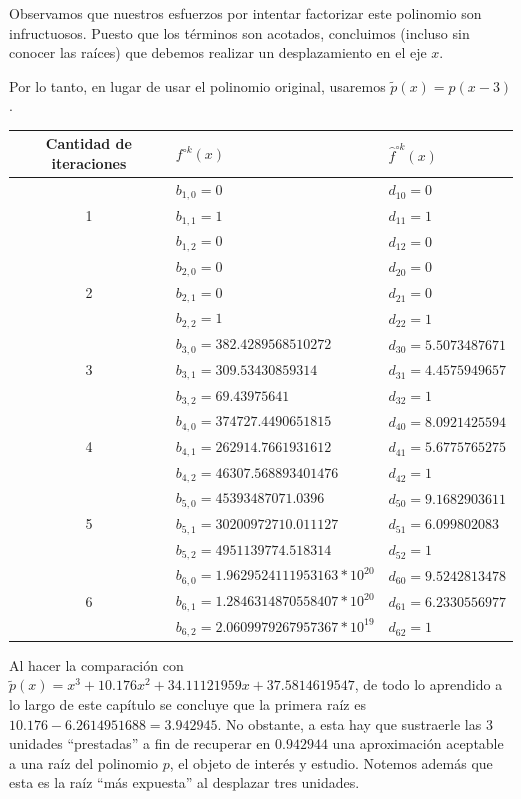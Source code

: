 \documentclass[oneside,11pt]{book}
\theoremstyle{definition}
\theoremstyle{plain}
\theoremstyle{remark}
\begin{document}
Observamos que nuestros esfuerzos por intentar factorizar este polinomio son infructuosos.
Puesto que los t\'erminos son acotados, concluimos (incluso sin conocer las ra\'ices) 
que debemos realizar un desplazamiento en el eje $x$.

Por lo tanto, en lugar de usar el polinomio original, usaremos $\tilde{p}(x)=p(x-3)$. 

\begin{center}
\begin{tabular}{ | c | l | l| }
\hline
 Cantidad de iteraciones & $f^{\circ k}(x)$& $\hat{f}^{\circ k}(x)$ \\
 \hline 
& $b_{1,0}= 0$ & $d_{10}=0$\\
1 & $b_{1,1}= 1$  & $d_{11}=1$\\ 
& $b_{1,2}= 0$ & $d_{12}=0$\\  
 \hline 
& $b_{2,0}= 0$& $d_{20}=0$ \\
2 & $b_{2,1}= 0$ & $d_{21}=0$\\ 
& $b_{2,2}= 1$& $d_{22}=1$\\
\hline
& $b_{3,0}= 382.4289568510272$ & $d_{30}=5.5073487671$\\
3 & $b_{3,1}= 309.53430859314$ & $d_{31}=4.4575949657$\\ 
& $b_{3,2}= 69.43975641$ & $d_{32}=1$\\
\hline
& $b_{4,0}= 374727.4490651815$ & $d_{40}=8.0921425594$\\
4 & $b_{4,1}= 262914.7661931612$   & $d_{41}=5.6775765275$\\ 
& $b_{4,2}= 46307.568893401476$ & $d_{42}=1$\\
\hline
& $b_{5,0}= 45393487071.0396$ & $d_{50}=9.1682903611$\\
5 & $b_{5,1}= 30200972710.011127$  & $d_{51}=6.099802083$\\ 
& $b_{5,2}= 4951139774.518314$ & $d_{52}=1$\\
\hline
& $b_{6,0}= 1.9629524111953163*10^{20}$ & $d_{60}=9.5242813478$\\
6 & $b_{6,1}= 1.2846314870558407*10^{20}$ & $d_{61}=6.2330556977$\\ 
& $b_{6,2}= 2.0609979267957367*10^{19}$ & $d_{62}=1$\\
\hline
\end{tabular}
\end{center}

Al hacer la comparaci\'on con $\tilde{p}(x)=x^3+10.176x^2+34.11121959x+37.5814619547$,
de todo lo aprendido a lo largo de este cap\'itulo se concluye que la primera ra\'iz es $10.176-6.2614951688=3.942945$. 
No obstante, a esta hay que sustraerle las $3$ unidades ``prestadas'' 
a fin de recuperar en $0.942944$ una 
aproximaci\'on aceptable a una ra\'iz del polinomio $p$, el objeto de inter\'es y estudio.
Notemos adem\'as que esta es la ra\'iz ``m\'as expuesta'' al desplazar tres unidades.
\end{document}
